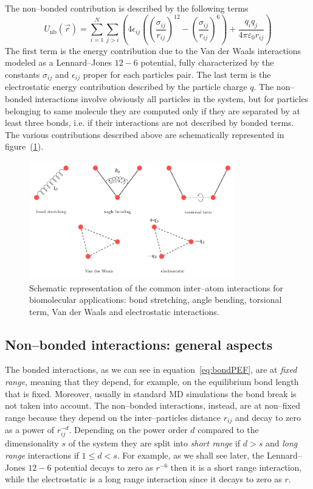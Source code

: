 The non--bonded contribution is described by the following terms
\begin{equation}
	U_\text{nb}(\vec r) = \sum_{i=1}^N \sum_{j>i} \left ( {4\epsilon_{ij} \left ( \left ( \frac{\sigma_{ij}}{r_{ij}} \right )^{12} - \left ( \frac{\sigma_{ij}}{r_{ij}} \right )^6 \right )  + \frac{q_iq_j}{4\pi\varepsilon_0 r_{ij}}} \right )
	\label{eq:nonbonPEF}
\end{equation}
The first term is the energy contribution due to the Van der Waals interactions modeled as a Lennard--Jones
$12-6$ potential, fully characterized by the constants $\sigma_{ij}$ and $\epsilon_{ij}$ proper for each
particles pair. The last term is the electrostatic energy contribution described by the particle charge $q$. The
non--bonded interactions involve obviously all particles in the system, but for particles belonging to same
molecule they are computed only if they are separated by at least three bonds, i.e. if their interactions are not
described by bonded terms. The various contributions described above are schematically represented in
figure~(\ref{fig:FFInteraction}).
\begin{figure}[!ht]
	\centering
	\includegraphics[width=0.8\textwidth]{./img/interPartInt/interPartInt}
	\caption{Schematic representation of the common inter--atom interactions for biomolecular applications: bond stretching, angle bending, torsional term, Van der Waals and electrostatic interactions.}
	\label{fig:FFInteraction}
\end{figure}

\subsection{Non--bonded interactions: general aspects}
\label{sec:nonbonded}
The bonded interactions, as we can see in equation~\eqref{eq:bondPEF}, are at \textit{fixed range}, meaning that
they depend, for example, on the equilibrium bond length that is fixed. Moreover, usually in standard \ac{MD}
simulations the bond break is not taken into account. The non--bonded interactions, instead, are at non--fixed
range because they depend on the inter--particles distance $r_{ij}$ and decay to zero as a power of
$r_{ij}^{-d}$. Depending on the power order $d$ compared to the dimensionality $s$ of the system they are split
into \textit{short range} if $d>s$ and \textit{long range} interactions if $1 \le d < s$. For example, as we
shall see later, the Lennard--Jones $12-6$ potential decays to zero as $r^{-6}$ then it is a short range
interaction, while the electrostatic is a long range interaction since it decays to zero as $r$.

